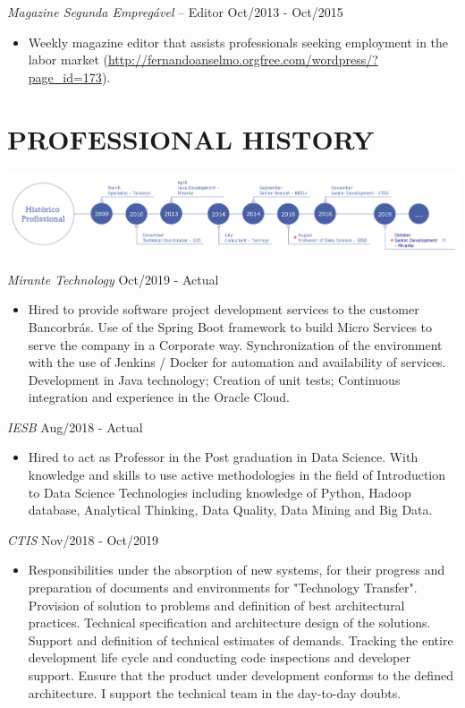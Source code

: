 \documentclass{res}
\begin{document}
\begin{resume}
		{\sl Magazine Segunda Empregável} -- Editor \hfill Oct/2013 - Oct/2015
		\begin{itemize}
			\item Weekly magazine editor that assists professionals seeking employment in the labor 
			market (\url{http://fernandoanselmo.orgfree.com/wordpress/?page_id=173}).
		\end{itemize}
		
		\section{PROFESSIONAL HISTORY} %
		\vspace{8pt}
		\includegraphics[width=1.0\textwidth]{imagens/experience}
		
		{\sl Mirante Technology} \hfill Oct/2019 - Actual
		\begin{itemize}
			\item Hired to provide software project development services to the customer Bancorbrás. Use of the Spring Boot framework to build Micro Services to serve the company in a Corporate way. Synchronization of the environment with the use of Jenkins / Docker for automation and availability of services. Development in Java technology; Creation of unit tests; Continuous integration and experience in the Oracle Cloud. 
		\end{itemize}
		
		{\sl IESB} \hfill Aug/2018 - Actual
		\begin{itemize}
			\item Hired to act as Professor in the Post graduation in Data Science. With knowledge and skills to use active methodologies in the field of Introduction to Data Science Technologies including knowledge of Python, Hadoop database, Analytical Thinking, Data Quality, Data Mining and Big Data.
		\end{itemize}
		
		{\sl CTIS} \hfill Nov/2018 - Oct/2019
		\begin{itemize}
			\item Responsibilities under the absorption of new systems, for their progress and preparation of documents and environments for "Technology Transfer". Provision of solution to problems and definition of best architectural practices. Technical specification and architecture design of the solutions. Support and definition of technical estimates of demands. Tracking the entire development life cycle and conducting code inspections and developer support. Ensure that the product under development conforms to the defined architecture. I support the technical team in the day-to-day doubts.
		\end{itemize}
		

\end{resume}
\end{document}
